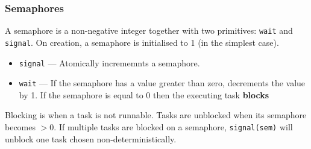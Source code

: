\documentclass{article}
\begin{document}
\subsubsection{Semaphores}
A semaphore is a non-negative integer together with two primitives: {\tt wait} and {\tt signal}.
On creation, a semaphore is initialised to 1 (in the simplest case).
\begin{itemize}
	\item {\tt signal} --- Atomically incrememnts a semaphore.
	\item {\tt wait} --- If the semaphore has a value greater than zero, decrements the value by 1.
If the semaphore is equal to 0 then the executing task \textbf{blocks}
\end{itemize}
Blocking is when a task is not runnable.
Tasks are unblocked when its semaphore becomes $>0$.
If multiple tasks are blocked on a semaphore, {\tt signal(sem)} will unblock one task chosen non-deterministically.
\end{document}
